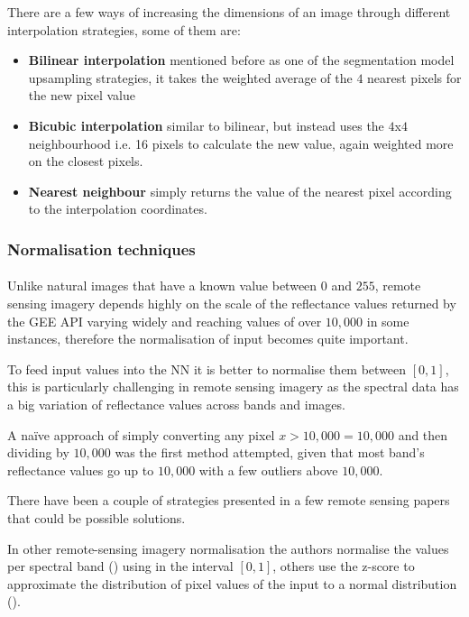 There are a few ways of increasing the dimensions of an image through different interpolation strategies, some of them are:
    \begin{itemize}
        \item \textbf{Bilinear interpolation} mentioned before as one of the segmentation model upsampling strategies, it takes the weighted average of the $4$ nearest pixels for the new pixel value
        \item \textbf{Bicubic interpolation} similar to bilinear, but instead uses the $4$x$4$ neighbourhood \gls{i.e.} 16 pixels to calculate the new value, again weighted more on the closest pixels. 
        \item \textbf{Nearest neighbour} simply returns the value of the nearest pixel according to the interpolation coordinates.
    \end{itemize}
\subsubsection{Normalisation techniques} \label{img_norm}
\paragraph{}
Unlike natural images that have a known value between $0$ and $255$, remote sensing imagery depends highly on the scale of the reflectance values returned by the \gls{GEE} API varying widely and reaching values of over $10,000$ in some instances, therefore the normalisation of input becomes quite important.

To feed input values into the \gls{NN} it is better to normalise them between $[0,1]$, this is particularly challenging in remote sensing imagery as the spectral data has a big variation of reflectance values across bands and images. 

A na\"ive approach of simply converting any pixel $x>10,000 =10,000$ and then dividing by $10,000$ was the first method attempted, given that most band's reflectance values go up to $10,000$ with a few outliers above $10,000$.

There have been a couple of strategies presented in a few remote sensing papers that could be possible solutions.

In other remote-sensing imagery normalisation the authors normalise the values per spectral band (\cite{8516352}) using in the interval $[0,1]$, others use the z-score to
approximate the distribution of pixel values of the input to a normal distribution (\cite{Zhong2017SatCNNSI}). 

